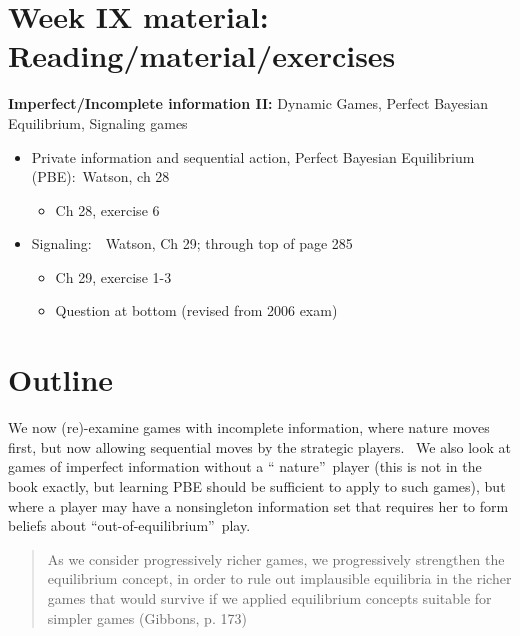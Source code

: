 \documentclass{article}
\begin{document}
\section{Week IX material: Reading/material/exercises}

\textbf{Imperfect/Incomplete information II: }Dynamic Games, Perfect
Bayesian Equilibrium, Signaling games

\begin{itemize}
\item Private information and sequential action, Perfect Bayesian
Equilibrium (PBE):\ Watson, ch 28

\begin{itemize}
\item Ch 28, exercise 6
\end{itemize}

\item Signaling:\ \ Watson, Ch 29; through top of page 285

\begin{itemize}
\item Ch 29, exercise 1-3

\item Question at bottom (revised from 2006 exam)
\end{itemize}
\end{itemize}

\bigskip 

\section{Outline}

We now (re)-examine games with incomplete information, where nature moves
first, but now allowing sequential moves by the strategic players. \ We also
look at games of imperfect information without a \textquotedblleft
nature\textquotedblright\ player {\footnotesize (this is not in the book
exactly, but learning PBE should be sufficient to apply to such games)}, but
where a player may have a nonsingleton information set that requires her to
form beliefs about \textquotedblleft out-of-equilibrium\textquotedblright\
play. \bigskip 

\begin{quote}
As we consider progressively richer games, we progressively strengthen the
equilibrium concept, in order to rule out implausible equilibria in the
richer games that would survive if we applied equilibrium concepts suitable
for simpler games (Gibbons, p. 173)
\end{quote}
\end{document}
